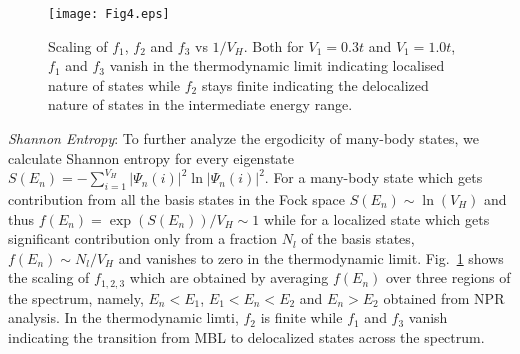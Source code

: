 \documentclass[prl,aps,twocolumn,floats,nofootinbib,showpacs]{revtex4}
\begin{document}
\begin{figure}[h!]
\begin{center}
\hskip-0.6cm
\texttt{[image: Fig4.eps]}
\vskip-0.3cm
\caption{Scaling of $f_1$, $f_2$ and $f_3$ vs $1/V_H$. Both for $V_1=0.3t$ and $V_1=1.0t$, $f_1$ and $f_3$ vanish in the thermodynamic limit indicating localised nature of states while $f_2$ stays finite indicating the delocalized nature of states in the intermediate energy range.}
\label{shannon1}
\end{center}
\end{figure}

{\it{Shannon Entropy}}:
To further analyze the ergodicity of many-body states, we calculate Shannon entropy for every eigenstate $S(E_n)=-\sum_{i=1}^{V_H}|\Psi_n(i)|^2\ln|\Psi_n(i)|^2$. For a many-body state which gets contribution from all the basis states in the Fock space $S(E_n)\sim \ln(V_H)$ and thus $f(E_n)=\exp(S(E_n))/V_H \sim 1$ while for a localized state which gets significant contribution only from a fraction $N_l$ of the basis states, $f(E_n)\sim N_l/V_H$ and vanishes to zero in the thermodynamic limit.  Fig.~\ref{shannon1} shows the scaling of $f_{1,2,3}$ which are obtained by averaging $f(E_n)$ over three regions of the spectrum, namely, $E_n< E_1$, $E_1<E_n<E_2$ and $E_n>E_2$ obtained from NPR analysis. In the thermodynamic limti, $f_2$ is finite while $f_1$ and $f_3$ vanish~\cite{supplemental} indicating the transition from MBL to delocalized states across the spectrum. 
\end{document}
